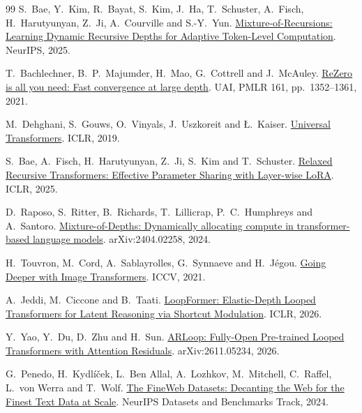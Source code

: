 \documentclass[11pt,letterpaper]{article}
\begin{document}
\begin{thebibliography}{99}\small
{}
S.~Bae, Y.~Kim, R.~Bayat, S.~Kim, J.~Ha, T.~Schuster, A.~Fisch, H.~Harutyunyan, Z.~Ji, A.~Courville and S.-Y.~Yun.
\href{https://papers.nips.cc/paper_files/paper/2025/hash/8b08bbf8b420faa6eeb4020720582ec7-Abstract-Conference.html}{Mixture-of-Recursions: Learning Dynamic Recursive Depths for Adaptive Token-Level Computation}. NeurIPS, 2025.

T.~Bachlechner, B.~P.~Majumder, H.~Mao, G.~Cottrell and J.~McAuley.
\href{https://proceedings.mlr.press/v161/bachlechner21a.html}{ReZero is all you need: Fast convergence at large depth}. UAI, PMLR 161, pp.~1352--1361, 2021.

M.~Dehghani, S.~Gouws, O.~Vinyals, J.~Uszkoreit and {\L}.~Kaiser.
\href{https://arxiv.org/abs/1807.03819}{Universal Transformers}. ICLR, 2019.

S.~Bae, A.~Fisch, H.~Harutyunyan, Z.~Ji, S.~Kim and T.~Schuster.
\href{https://proceedings.iclr.cc/paper_files/paper/2025/hash/54d6a55225cebbdc16fbb0e45c5bdf2b-Abstract-Conference.html}{Relaxed Recursive Transformers: Effective Parameter Sharing with Layer-wise LoRA}. ICLR, 2025.

D.~Raposo, S.~Ritter, B.~Richards, T.~Lillicrap, P.~C.~Humphreys and A.~Santoro.
\href{https://arxiv.org/abs/2404.02258}{Mixture-of-Depths: Dynamically allocating compute in transformer-based language models}. arXiv:2404.02258, 2024.

H.~Touvron, M.~Cord, A.~Sablayrolles, G.~Synnaeve and H.~J\'egou.
\href{https://openaccess.thecvf.com/content/ICCV2021/html/Touvron_Going_Deeper_With_Image_Transformers_ICCV_2021_paper.html}{Going Deeper with Image Transformers}. ICCV, 2021.

A.~Jeddi, M.~Ciccone and B.~Taati.
\href{https://openreview.net/forum?id=RzYXb5YWBs}{LoopFormer: Elastic-Depth Looped Transformers for Latent Reasoning via Shortcut Modulation}. ICLR, 2026.

Y.~Yao, Y.~Du, D.~Zhu and H.~Sun.
\href{https://arxiv.org/abs/2611.05234}{ARLoop: Fully-Open Pre-trained Looped Transformers with Attention Residuals}. arXiv:2611.05234, 2026.

G.~Penedo, H.~Kydl\'i\v{c}ek, L.~Ben Allal, A.~Lozhkov, M.~Mitchell, C.~Raffel, L.~von Werra and T.~Wolf.
\href{https://arxiv.org/abs/2406.17557}{The FineWeb Datasets: Decanting the Web for the Finest Text Data at Scale}. NeurIPS Datasets and Benchmarks Track, 2024.


\end{thebibliography}
\end{document}

